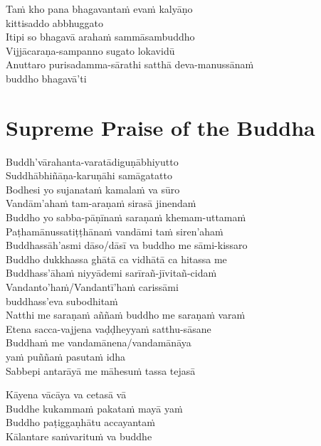 Taṁ kho pana bhagavantaṁ evaṁ kalyāṇo\\
\vin kittisaddo abbhuggato\\
Itipi so bhagavā arahaṁ sammāsambuddho\\
Vijjācaraṇa-sampanno sugato lokavidū\\
Anuttaro purisadamma-sārathi satthā deva-manussānaṁ\\
\vin buddho bhagavā'ti

\section*{Supreme Praise of the Buddha}

\begin{leader}
\end{leader}

Buddh'vārahanta-varatādiguṇābhiyutto\\
Suddhābhiñāṇa-karuṇāhi samāgatatto\\
Bodhesi yo sujanataṁ kamalaṁ va sūro\\
Vandām'ahaṁ tam-araṇaṁ sirasā jinendaṁ\\
Buddho yo sabba-pāṇīnaṁ saraṇaṁ khemam-uttamaṁ\\
Paṭhamānussatiṭṭhānaṁ vandāmi taṁ siren'ahaṁ\\
Buddhassāh'asmi dāso/dāsī va buddho me sāmi-kissaro\\
Buddho dukkhassa ghātā ca vidhātā ca hitassa me\\
Buddhass'āhaṁ niyyādemi sarīrañ-jīvitañ-cidaṁ\\
Vandanto'haṁ/Vandantī'haṁ carissāmi\\
\vin buddhass'eva subodhitaṁ\\
Natthi me saraṇaṁ aññaṁ buddho me saraṇaṁ varaṁ\\
Etena sacca-vajjena vaḍḍheyyaṁ satthu-sāsane\\
Buddhaṁ me vandamānena/vandamānāya\\
\vin yaṁ puññaṁ pasutaṁ idha\\
Sabbepi antarāyā me māhesuṁ tassa tejasā

\enlargethispage{\baselineskip}


Kāyena vācāya va cetasā vā\\
Buddhe kukammaṁ pakataṁ mayā yaṁ\\
Buddho paṭiggaṇhātu accayantaṁ\\
Kālantare saṁvarituṁ va buddhe

